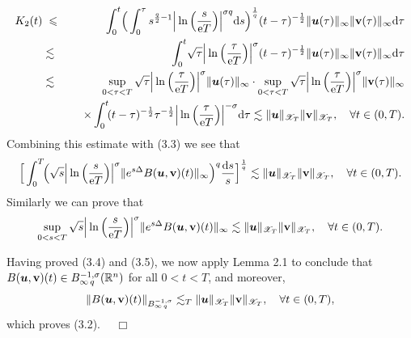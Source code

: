 \documentclass[11pt]{article}
\newcommand{\rmd}{\mbox{\rm d}}
\newcommand{\bfu}{{\mbox{\boldmath $u$}}}
\newcommand{\rme}{{\rm e}}
\begin{document}
\begin{eqnarray*}
  K_2(t)&\;\leqslant\;& \int_0^t\!\Big(\int_0^{\tau}s^{\frac{q}{2}-1}\Big|\ln\Big(\frac{s}{\rme T}\Big)\Big|^{\sigma q}\rmd s\Big)^{\frac{1}{q}}
  (t-\tau)^{-\frac{1}{2}}\|\bfu(\tau)\|_{\infty}\|\mathbf{v}(\tau)\|_{\infty}\rmd\tau
\nonumber\\
  &\lesssim &\int_0^t\!\sqrt{\tau}\Big|\ln\Big(\frac{\tau}{\rme T}\Big)\Big|^{\sigma}(t-\tau)^{-\frac{1}{2}}
  \|\bfu(\tau)\|_{\infty}\|\mathbf{v}(\tau)\|_{\infty}\rmd\tau
\nonumber\\
  &\lesssim &\sup_{0<\tau<T}\sqrt{\tau}\Big|\ln\Big(\frac{\tau}{\rme T}\Big)\Big|^{\sigma}\|\bfu(\tau)\|_{\infty}\cdot
  \sup_{0<\tau<T}\sqrt{\tau}\Big|\ln\Big(\frac{\tau}{\rme T}\Big)\Big|^{\sigma}\|\mathbf{v}(\tau)\|_{\infty}
\nonumber\\
  && \quad \times\int_0^t\!(t-\tau)^{-\frac{1}{2}}\tau^{-\frac{1}{2}}\Big|\ln\Big(\frac{\tau}{\rme T}\Big)\Big|^{-\sigma}\rmd\tau
  \lesssim\|\bfu\|_{\mathscr{X}_T}\|\mathbf{v}\|_{\mathscr{X}_T}, \quad \forall t\in (0,T).
\end{eqnarray*}
  Combining this estimate with (3.3) we see that
\begin{equation}
  \Big[\int_0^T\!\!\Big(\sqrt{s}\Big|\ln\Big(\frac{s}{\rme T}\Big)\Big|^{\sigma}\|e^{s\Delta}B(\bfu,\mathbf{v})(t)\|_{\infty}
  \Big)^q\frac{\rmd s}{s}\Big]^{\frac{1}{q}}\lesssim\|\bfu\|_{\mathscr{X}_T}\|\mathbf{v}\|_{\mathscr{X}_T}, \quad \forall t\in (0,T).
\end{equation}
  Similarly we can prove that
\begin{equation}
  \sup_{0<s<T}\sqrt{s}\Big|\ln\Big(\frac{s}{\rme T}\Big)\Big|^{\sigma}\|e^{s\Delta}B(\bfu,\mathbf{v})(t)\|_{\infty}
  \lesssim\|\bfu\|_{\mathscr{X}_T}\|\mathbf{v}\|_{\mathscr{X}_T}, \quad \forall t\in (0,T).
\end{equation}

  Having proved (3.4) and (3.5), we now apply Lemma 2.1 to conclude that $B(\bfu,\mathbf{v})(t)\in B^{-1,\sigma}_{\infty\, q}(\mathbb{R}^n)$ for all
  $0<t<T$, and moreover,
\begin{eqnarray*}
  \|B(\bfu,\mathbf{v})(t)\|_{B^{-1,\sigma}_{\infty\, q}}\lesssim_T\|\bfu\|_{\mathscr{X}_T}\|\mathbf{v}\|_{\mathscr{X}_T},
   \quad \forall t\in (0,T),
\end{eqnarray*}
  which proves (3.2). $\quad\Box$
\medskip
\end{document}
